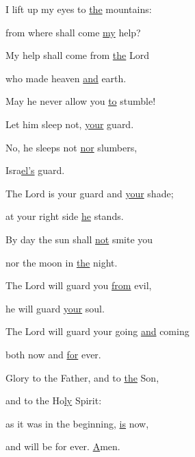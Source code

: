 \noindent I lift up my eyes to \uline{the} mountains:~\GreStar{}~\nopagebreak

from where shall come \uline{my} help?

\noindent My help shall come from \uline{the} Lord~\GreStar{}~\nopagebreak

who made heaven \uline{and} earth.

\noindent May he never allow you \uline{to} stumble!~\GreStar{}~\nopagebreak

Let him sleep not, \uline{your} guard.

\noindent No, he sleeps not \uline{nor} slumbers,~\GreStar{}~\nopagebreak

Isra\uline{el’s} guard.

\noindent The Lord is your guard and \uline{your} shade;~\GreStar{}~\nopagebreak

at your right side \uline{he} stands.

\noindent By day the sun shall \uline{not} smite you~\GreStar{}~\nopagebreak

nor the moon in \uline{the} night.

\noindent The Lord will guard you \uline{from} evil,~\GreStar{}~\nopagebreak

he will guard \uline{your} soul.

\noindent The Lord will guard your going \uline{and} coming~\GreStar{}~\nopagebreak

both now and \uline{for} ever.

\noindent Glory to the Father, and to \uline{the} Son,~\GreStar{}~\nopagebreak

and to the Ho\uline{ly} Spirit:

\noindent as it was in the beginning, \uline{is} now,~\GreStar{}~\nopagebreak

and will be for ever. \uline{A}men.
